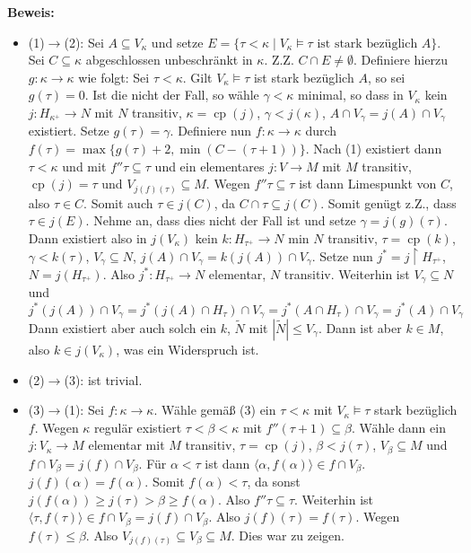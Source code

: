\documentclass[a4paper,fontsize=11pt]{scrartcl}
\newcommand{\cp}{\operatorname{cp}}
\begin{document}
	{\bf Beweis:}\begin{itemize}\item (1)$\to$(2): Sei $A\subseteq V_\kappa$ und setze $E=\{\tau<\kappa\mid V_\kappa\models \tau \mbox{ ist stark bezüglich } A\}$.
		Sei $C\subseteq \kappa$ abgeschlossen unbeschränkt in $\kappa$.
		Z.Z. $C\cap E\neq\emptyset$.
		Definiere hierzu $g\colon\kappa\to\kappa$ wie folgt:
		Sei $\tau<\kappa$.
		Gilt $V_{\kappa}\models \tau$ ist stark bezüglich $A$, so sei $g(\tau)=0$.
		Ist die nicht der Fall, so wähle $\gamma<\kappa$ minimal, so dass in $V_{\kappa}$ kein $j\colon H_{\kappa^+}\to N$ mit $N$ transitiv, $\kappa=\cp(j)$,
		$\gamma<j(\kappa)$, $A\cap V_{\gamma}=j(A)\cap V_\gamma$ existiert.
		Setze $g(\tau)=\gamma$.
		Definiere nun $f\colon \kappa\to\kappa$ durch $f(\tau)=\max\{g(\tau)+2, \min(C-(\tau+1))\}$.
		Nach (1) existiert dann $\tau<\kappa$ und mit $f''\tau\subseteq\tau$ und ein elementares $j\colon V\to M$ mit $M$ transitiv, $\cp(j)=\tau$ und $V_{j(f)(\tau)}\subseteq M$.
		Wegen $f''\tau\subseteq\tau$ ist dann Limespunkt von $C$, also $\tau\in C$.
		Somit auch $\tau \in j(C)$, da $C\cap\tau \subseteq j(C)$.
		Somit genügt z.Z., dass $\tau\in j(E)$.
		Nehme an, dass dies nicht der Fall ist und setze $\gamma= j(g)(\tau)$.
		Dann existiert also in $j(V_\kappa)$ kein  $k\colon H_{\tau^+}\to N$ min $N$ transitiv, $\tau=\cp(k)$, $\gamma<k(\tau)$, $V_\gamma\subseteq N$, $j(A)\cap V_\gamma = k(j(A))\cap V_\gamma$.
		Setze nun $j^*=j\upharpoonright H_{\tau^+}$, $N=j(H_{\tau^+})$.
		Also $j^*\colon H_{\tau^+}\to N$ elementar, $N$ transitiv.
		Weiterhin ist $V_{\gamma}\subseteq N$ und $j^*(j(A))\cap V_\gamma=j^*(j(A)\cap H_{\tau})\cap V_{\gamma}=j^*(A\cap H_\tau)\cap V_\gamma =  j^*(A)\cap V_{\gamma}$
		Dann existiert aber auch solch ein $k$, $\tilde N$ mit $|\tilde N|\le V_\gamma$.
		Dann ist aber $k\in M$, also $k\in j(V_\kappa)$, was ein Widerspruch ist.
		\item (2)$\to$(3): ist trivial.
		\item (3)$\to$(1): Sei $f\colon\kappa\to\kappa$.
		Wähle gemäß (3) ein $\tau<\kappa$ mit $V_\kappa\models\tau$ stark bezüglich $f$.
		Wegen $\kappa$ regulär existiert $\tau<\beta<\kappa$ mit $f''(\tau+1)\subseteq\beta$.
		Wähle dann ein $j\colon V_{\kappa}\to M$ elementar mit $M$ transitiv, $\tau = \cp(j)$, $\beta< j(\tau)$, $V_{\beta}\subseteq M$ und $f\cap V_{\beta}=j(f)\cap V_{\beta}$.
		Für $\alpha<\tau$ ist dann $\langle \alpha, f(\alpha)\rangle\in f\cap V_{\beta}$.
		$j(f)(\alpha)=f(\alpha)$.
		Somit $f(\alpha)<\tau$, da sonst $j(f(\alpha))\ge j(\tau) > \beta\ge f(\alpha)$.
		Also $f''\tau\subseteq\tau$.
		Weiterhin ist $\langle\tau, f(\tau)\rangle\in f\cap V_{\beta} = j(f)\cap V_{\beta}$.
		Also $j(f)(\tau)=f(\tau)$.
		Wegen $f(\tau)\le\beta$.
		Also $V_{j(f)(\tau)}\subseteq V_\beta\subseteq M$.
		Dies war zu zeigen.
	\end{itemize}
\end{document}
